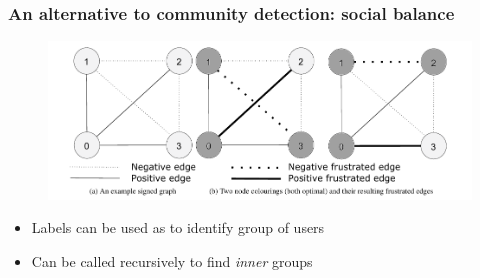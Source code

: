 \documentclass{beamer}
\begin{document}
\begin{frame}[c]
    \frametitle{An alternative to community detection: social balance}
    \begin{figure}[htpb]
        \centering
        \includegraphics[width=0.8\linewidth]{img/frustration.png}
    \end{figure}
    \begin{itemize}
        \item Labels can be used as to identify group of users
        \item Can be called recursively to find \textit{inner} groups
    \end{itemize}
\end{frame}
\end{document}
